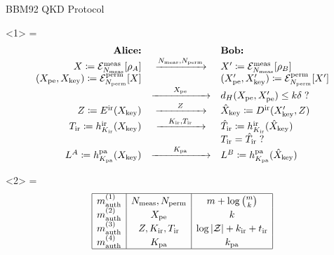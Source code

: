 \documentclass[xcolor=dvipsnames]{beamer}
\newcommand{\?}{\mathrel{?}} %
\newcommand{\abs}[1]{\left\lvert#1\right\rvert} %
\newenvironment{Array}[1] %
{\def\arraystretch{1.75}\everymath={\displaystyle}\[\begin{array}{#1}}
{\end{array}\]}
\newcommand{\sZ}{\mathcal{Z}}
\newcommand{\cE}{\mathcal{E}}
\newcommand{\meas}{\rm meas}
\newcommand{\perm}{\rm perm}
\newcommand{\pe}{\rm pe}
\newcommand{\pa}{\rm pa}
\newcommand{\ir}{\rm ir}
\newcommand{\auth}{\rm auth}
\newcommand{\key}{\rm key}
\begin{document}
\begin{frame}{BBM92 QKD Protocol}
  \begin{onlyenv}<1>
    \begin{Array}{rcl}
      \text{\textbf{Alice:}} & & \text{\textbf{Bob:}} \\
      X \coloneqq \cE^{\meas}_{N_{\meas}} [\rho_{A}] & \xrightarrow{N_{\meas}, N_{\perm}} & X' \coloneqq \cE^{\meas}_{N_{\meas}} [\rho_{B}] \\
      (X_{\pe}, X_{\key}) \coloneqq \cE^{\perm}_{N_{\perm}} [X] & & (X'_{\pe}, X'_{\key}) \coloneqq \cE^{\perm}_{N_{\perm}} [X']  \\
                                                                & \xrightarrow{\qquad X_{\pe} \qquad} & d_H(X_{\pe}, X'_{\pe}) \leq k\delta \? \\
      Z \coloneqq E^{\ir}(X_{\key}) & \xrightarrow{\qquad Z \qquad} & \hat{X}_{\key} \coloneqq D^{\ir}(X'_{\key}, Z) \\
      T_{\ir} \coloneqq h^{\ir}_{K_{\ir}}(X_{\key}) & \xrightarrow{\quad K_{\ir}, T_{\ir} \quad} & \hat{T}_{\ir} \coloneqq h^{\ir}_{K_{\ir}}(\hat{X}_{\key}) \\
                                                    & & T_{\ir} = \hat{T}_{\ir} \? \\
      L^A \coloneqq h^{\pa}_{K_{\pa}}(X_{\key}) & \xrightarrow{\qquad K_{\pa} \qquad} & L^B \coloneqq h^{\pa}_{K_{\pa}}(\hat{X}_{\key}) \\
    \end{Array}
  \end{onlyenv}
  \begin{onlyenv}<2>
    \begin{Array}{|c|c|c|}
      \hline
      m_{\auth}^{(1)} & N_{\meas}, N_{\perm} & m + \log \binom{m}{k} \\
      m_{\auth}^{(2)} & X_{\pe} & k \\
      m_{\auth}^{(3)} & Z, K_{\ir}, T_{\ir} & \log \abs{\sZ} + k_{\ir} + t_{\ir} \\
      m_{\auth}^{(4)} & K_{\pa} & k_{\pa} \\
      \hline
    \end{Array}
  \end{onlyenv}
\end{frame}
\end{document}
